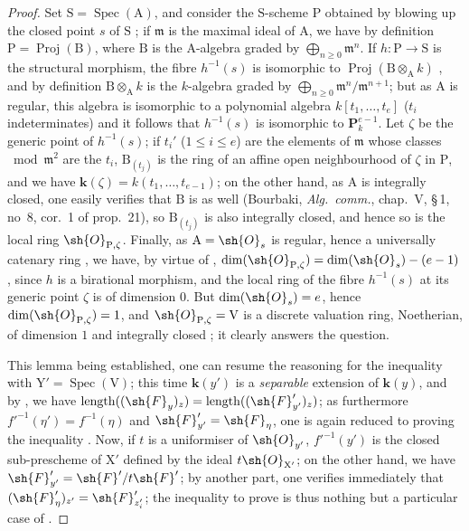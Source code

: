 \begin{proof}
Set $\mathrm{S}=\operatorname{Spec}(\mathrm{A})$, and consider the $\mathrm{S}$-scheme $\mathrm{P}$ obtained by blowing up the closed point $s$ of $\mathrm{S}$ ; if $\mathfrak{m}$ is the maximal ideal of $\mathrm{A}$, we have by definition $\mathrm{P}=\operatorname{Proj}(\mathrm{B})$, where $\mathrm{B}$ is the $\mathrm{A}$-algebra graded by $\bigoplus_{n\geqslant 0}\mathfrak{m}^n$.
If $h:\mathrm{P}\to\mathrm{S}$ is the structural morphism, the fibre $h^{-1}(s)$ is isomorphic to $\operatorname{Proj}(\mathrm{B}\otimes_\mathrm{A} k)$ , and by definition $\mathrm{B}\otimes_\mathrm{A} k$ is the $k$-algebra graded by $\bigoplus_{n\geqslant 0}\mathfrak{m}^n/\mathfrak{m}^{n+1}$; but as $\mathrm{A}$ is regular, this algebra is isomorphic to a polynomial algebra $k[t_1,\ldots,t_e]$ ($t_i$ indeterminates)  and it follows that $h^{-1}(s)$ is isomorphic to $\mathbf{P}_k^{e-1}$.
Let $\zeta$ be the generic point of $h^{-1}(s)$; if $t_i'$ ($1\leqslant i\leqslant e$) are the elements of $\mathfrak{m}$ whose classes $\bmod\mathfrak{m}^2$ are the $t_i$, $\mathrm{B}_{(t_j)}$ is the ring of an affine open neighbourhood of $\zeta$ in $\mathrm{P}$, and we have $\mathbf{k}(\zeta)=k(t_1,\ldots,t_{e-1})$; on the other hand, as $\mathrm{A}$ is integrally closed, one easily verifies that $\mathrm{B}$ is as well (Bourbaki, \emph{Alg.\ comm.}, chap.~V, \S\,1, no~8, cor.~1 of prop.~21), so $\mathrm{B}_{(t_j)}$ is also integrally closed, and hence so is the local ring $\sh{O}_{\mathrm{P},\zeta}$.
Finally, as $\mathrm{A}=\sh{O}_s$ is regular, hence a universally catenary ring , we have, by virtue of , $\dim(\sh{O}_{\mathrm{P},\zeta})=\dim(\sh{O}_s)-(e-1)$, since $h$ is a birational morphism, and the local ring of the fibre $h^{-1}(s)$ at its generic point $\zeta$ is of dimension $0$.
But $\dim(\sh{O}_s)=e$, hence $\dim(\sh{O}_{\mathrm{P},\zeta})=1$, and $\sh{O}_{\mathrm{P},\zeta}=\mathrm{V}$ is a discrete valuation ring, Noetherian, of dimension $1$ and integrally closed ; it clearly answers the question.

This lemma being established, one can resume the reasoning for the inequality  with $\mathrm{Y}'=\operatorname{Spec}(\mathrm{V})$; this time $\mathbf{k}(y')$ is a \emph{separable} extension of $\mathbf{k}(y)$, and by , we have $\operatorname{length}((\sh{F}_y)_z)=\operatorname{length}((\sh{F}_{y'}')_z)$; as furthermore $f'^{-1}(\eta')=f^{-1}(\eta)$ and $\sh{F}_{y'}'=\sh{F}_\eta$, one is again reduced to proving the inequality .
Now, if $t$ is a uniformiser of $\sh{O}_{y'}$, $f'^{-1}(y')$ is the closed sub-prescheme of $\mathrm{X}'$ defined by the ideal $t\sh{O}_{\mathrm{X}'}$; on the other hand, we have $\sh{F}_{y'}'=\sh{F}'/t\sh{F}'$; by another part, one verifies immediately  that $(\sh{F}_\eta')_{z'}=\sh{F}_{z_i'}'$; the inequality to prove  is thus nothing but a particular case of .
\end{proof}


